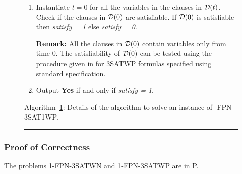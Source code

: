 {\begin{figure}[tbp]
\begin{enumerate}
\begin{enumerate}
\begin{enumerate}
\noindent
{\bf Remark:}
Delete all clauses containing  the occurrence of the variable 
$\overline{x_i(r)}$ and for all clauses which contain
$x_i(r)$ delete it from the clause. 



\item
$ j = j+1$

\noindent
{\bf Remark:} The formula $F^{\infty}$ as a result
of modification is given by 
\[ F_j^{\infty} = F_{j-1}^{\infty}(v[x_i(t)] = 1,~ 1 \leq t \leq m) 
\bigcup {\cal D}(t) - \left(\bigwedge_{t}N_{x_i}(t, t+1) 
\bigwedge_{t}P_{x_i}(t, t+1) \right) 
\bigcup \left(\bigwedge_{t}N'_{x_i}(t, t+1) \right) \]


\end{enumerate}

\item
If the formula $F = \phi$, then set {\em satisfy = 1} and {\em flag = 1}.

\end{enumerate}

\item
Instantiate $t = 0$ for all the variables in the clauses in ${\cal D}(t)$.
Check if the clauses in ${\cal D}(0)$ are satisfiable. 
If ${\cal D}(0)$ is satisfiable then {\em satisfy = 1} else {\em satisfy = 0}.

\noindent
{\bf Remark:} All the clauses in ${\cal D}(0)$ contain variables only 
from time 0. The satisfiability of ${\cal D}(0)$  can be tested using the
procedure given in \cite{Pa94} for {\sf 3SATWP} formulas specified using
standard specification.


\item
Output {\bf Yes} if and only if {\em satisfy = 1}.


\end{enumerate}
\label{1fpn3satwp:alg}
\begin{center}
Algorithm~\ref{1fpn3satwp:alg}: 
Details of the algorithm to solve an instance of 
{-FPN-3SAT1WP}.
\end{center}
\vspace*{-.2in}
\rule{\textwidth}{0.01in}
\end{figure}
}


\newspacing


\subsubsection{Proof of Correctness}
\begin{theorem}\label{th:fpn3satwneasy}
The problems 1-FPN-3SATWN and  1-FPN-3SATWP are  in P.
\end{theorem}


